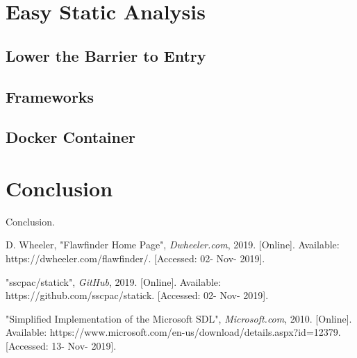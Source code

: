 \documentclass[journal]{IEEEtran}
\begin{document}
\section{Easy Static Analysis}

\subsection{Lower the Barrier to Entry}

\subsection{Frameworks}

\subsection{Docker Container}


\section{Conclusion}
Conclusion.



\begin{thebibliography}{00}

 D. Wheeler, "Flawfinder Home Page", \textit{Dwheeler.com}, 2019. [Online].
Available: https://dwheeler.com/flawfinder/. [Accessed: 02- Nov- 2019].

 "sscpac/statick", \textit{GitHub}, 2019. [Online]. Available:
https://github.com/sscpac/statick. [Accessed: 02- Nov- 2019].

 "Simplified Implementation of the Microsoft SDL", \textit{Microsoft.com}, 2010.
[Online]. Available: https://www.microsoft.com/en-us/download/details.aspx?id=12379. [Accessed: 13-
Nov- 2019].

\end{thebibliography}
\end{document}
